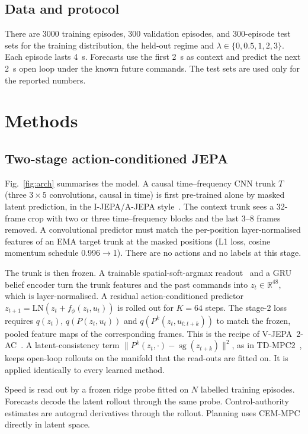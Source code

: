 \documentclass[10pt,journal]{IEEEtran}
\begin{document}
\subsection{Data and protocol}
There are 3000 training episodes, 300 validation episodes, and 300-episode test sets for the training distribution, the held-out regime and $\lambda\in\{0,0.5,1,2,3\}$. Each episode lasts \SI{4}{\second}. Forecasts use the first \SI{2}{\second} as context and predict the next \SI{2}{\second} open loop under the known future commands. The test sets are used only for the reported numbers.

\section{Methods}
\subsection{Two-stage action-conditioned JEPA}
Fig.~\ref{fig:arch} summarises the model. A causal time--frequency CNN trunk $T$ (three $3\times5$ convolutions, causal in time) is first pre-trained alone by masked latent prediction, in the I-JEPA/A-JEPA style~\cite{assran2023ijepa,fei2023ajepa}. The context trunk sees a 32-frame crop with two or three time--frequency blocks and the last 3--8 frames removed. A convolutional predictor must match the per-position layer-normalised features of an EMA target trunk at the masked positions (L1 loss, cosine momentum schedule 0.996$\to$1). There are no actions and no labels at this stage.

The trunk is then frozen. A trainable spatial-soft-argmax readout~\cite{finn2016spatial} and a GRU belief encoder turn the trunk features and the past commands into $z_t\in\mathbb{R}^{48}$, which is layer-normalised. A residual action-conditioned predictor $z_{t+1}=\mathrm{LN}(z_t+f_\phi(z_t,u_t))$ is rolled out for $K=64$ steps. The stage-2 loss requires $q(z_t)$, $q(P(z_t,u_t))$ and $q(P^k(z_t,u_{t:t+k}))$ to match the frozen, pooled feature maps of the corresponding frames. This is the recipe of V-JEPA~2-AC~\cite{assran2025vjepa2}. A latent-consistency term $\lVert P^k(z_t,\cdot)-\operatorname{sg}(z_{t+k})\rVert^2$, as in TD-MPC2~\cite{hansen2024tdmpc2}, keeps open-loop rollouts on the manifold that the read-outs are fitted on. It is applied identically to every learned method.

Speed is read out by a frozen ridge probe fitted on $N$ labelled training episodes. Forecasts decode the latent rollout through the same probe. Control-authority estimates are autograd derivatives through the rollout. Planning uses CEM-MPC directly in latent space.
\end{document}
